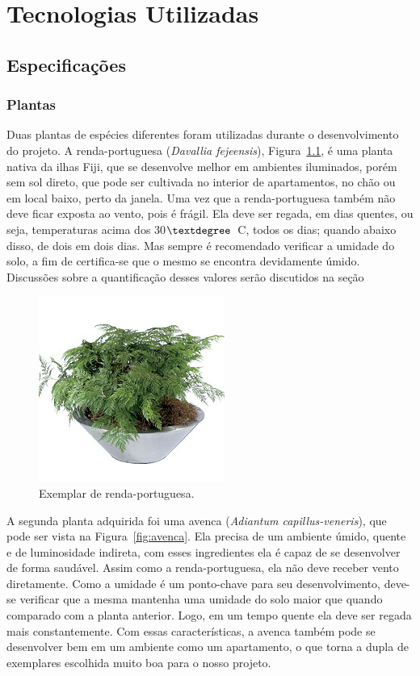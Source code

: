 \documentclass[a4paper,12pt]{report}
\begin{document}
\chapter{Tecnologias Utilizadas}
	\label{cap:Tecnologias}
	\section{Especificações}
	
	\subsection{Plantas}
	Duas plantas de espécies diferentes foram utilizadas durante o desenvolvimento do projeto. A renda-portuguesa (\textit{Davallia fejeensis}), Figura~\ref{fig:renda}, é uma planta nativa da ilhas Fiji, que se desenvolve melhor em ambientes iluminados, porém sem sol direto, que pode ser cultivada no interior de apartamentos, no chão ou em local baixo, perto da janela. Uma vez que a renda-portuguesa também não deve ficar exposta ao vento, pois é frágil. Ela deve ser regada, em dias quentes, ou seja, temperaturas acima dos 30$\textdegree$~C, todos os dias; quando abaixo disso, de dois em dois dias. Mas sempre é recomendado verificar a umidade do solo, a fim de certifica-se que o mesmo se encontra devidamente úmido. Discussões sobre a quantificação desses valores serão discutidos na seção %
		
\begin{figure}[!h]
	\centering
	\includegraphics[width=0.4\linewidth]{figs/renda}
	\caption{Exemplar de renda-portuguesa.}
	\label{fig:renda}
\end{figure}

	A segunda planta adquirida foi uma avenca (\textit{Adiantum capillus-veneris}), que pode ser vista na Figura~\ref{fig:avenca}. Ela precisa de um ambiente úmido, quente e de luminosidade indireta, com esses ingredientes ela é capaz de se desenvolver de forma saudável. Assim como a renda-portuguesa, ela não deve receber vento diretamente. Como a umidade é um ponto-chave para seu desenvolvimento, deve-se verificar que a mesma mantenha uma umidade do solo maior que quando comparado com a planta anterior. Logo, em um tempo quente ela deve ser regada mais constantemente. Com essas características, a avenca também pode se desenvolver bem em um ambiente como um apartamento, o que torna a dupla de exemplares escolhida muito boa para o nosso projeto. 
	
\end{document}
